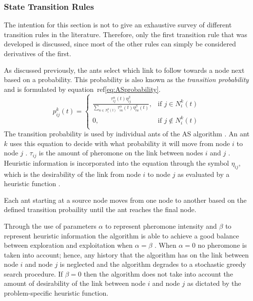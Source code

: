 \subsubsection{State Transition Rules}
\label{sec:STR}
The intention for this section is not to give an exhaustive survey of different transition rules in the literature. Therefore, only the first transition rule that was developed is discussed, since most of the other rules can simply be considered derivatives of the first. 

 As discussed previously, the ants select which link to follow towards a node next based on a probability. This probability is also known as the \emph{transition probability} and is formulated by equation~ref\ref{eq:ASprobability}.
\begin{equation}
\label{eq:ASprobability}
p^k_{ij}(t) =
\begin{cases}
	\frac{\tau^{\alpha}_{ij}(t)\eta^{\beta}_{ij}}{\sum_{u \in N^k_i(t)} {\tau^{\alpha}_{iu}(t)\eta^{\beta}_{iu}(t)}}, &\text{if $j \in N^k_i(t)$}\\
	0, &\text{if $j \notin N^k_i(t)$}\\
\end{cases}
\end{equation}
The transition probability is used by individual ants of the AS algorithm \cite{CompuIntelligenceIntro,AntSurvey,ACOLargeProblem,AntQAP,FundamentalSwarm}. An ant $k$ uses this equation to decide with what probability it will move from node $i$ to node $j$ \cite{CompuIntelligenceIntro,ACOLargeProblem,AntQAP,FundamentalSwarm}. $\tau_{ij}$ is the amount of pheromone on the link between nodes $i$ and $j$ \cite{CompuIntelligenceIntro,AntsAndStigmergy,ACOLargeProblem,AntQAP,FundamentalSwarm}. Heuristic information is incorporated into the equation through the symbol $\eta_{ij}$, which is the desirability of the link from node $i$ to node $j$ as evaluated by a heuristic function \cite{CompuIntelligenceIntro,AntsAndStigmergy,ACOLargeProblem,AntQAP,FundamentalSwarm}. 

Each ant starting at a source node moves from one node to another based on the defined transition probaility until the ant reaches the final node.

Through the use of parameters $\alpha$ to represent pheromone intensity and $\beta$ to represent heuristic information the algorithm is able to achieve a good balance between exploration and exploitation when $\alpha=\beta$ \cite{CompuIntelligenceIntro,ACOLargeProblem,AntQAP,FundamentalSwarm}. When $\alpha = 0$ no pheromone is taken into account; hence, any history that the algorithm has on the link between node $i$ and node $j$ is neglected and the algorithm degrades to a stochastic greedy search procedure. If $\beta = 0$ then the algorithm does not take into account the amount of desirability of the link between node $i$ and node $j$ as dictated by the problem-specific heuristic function.

